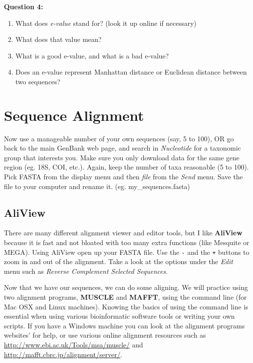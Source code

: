 \documentclass[11pt]{article}
\begin{document}
\begin{framed}
\noindent
\textbf{Question 4:}
\begin{enumerate}
    \item What does \textit{e-value} stand for? (look it up online if necessary)
    \item What does that value mean?
    \item What is a good e-value, and what is a bad e-value?
    \item Does an e-value represent Manhattan distance or Euclidean distance between two sequences?
\end{enumerate}
\end{framed}


\section{Sequence Alignment}


Now use a manageable number of your own sequences (say, 5 to 100),
OR
go back to the main GenBank web page, 
and search in \textit{Nucleotide} for a taxonomic group that interests you.
Make sure you only download data for the same gene region (eg. 18S, COI, etc.). 
Again, keep the number of taxa reasonable (5 to 100). 
Pick FASTA from the display menu and then \textit{file} from the \textit{Send} menu. 
Save the file to your computer and rename it. (eg. my\_sequences.fasta)

\subsection{AliView}

There are many different alignment viewer and editor tools,
but I like \textbf{AliView} because it is fast and not bloated
with too many extra functions (like Mesquite or MEGA).
Using AliView open up your FASTA file.
Use the \texttt{-} and the \texttt{+} buttons
to zoom in and out of the alignment.
Take a look at the options under the \textit{Edit} menu
such as \textit{Reverse Complement Selected Sequences}.

Now that we have our sequences, we can do some aligning.
We will practice using two alignment programs, 
\textbf{MUSCLE} and \textbf{MAFFT}, using the command line
(for Mac OSX and Linux machines). 
Knowing the basics of using the command line is essential
when using various bioinformatic software tools or writing
your own scripts.
If you have a Windows machine
you can look at the alignment programs websites' for help,
or use various online alignment resources such as
\url{http://www.ebi.ac.uk/Tools/msa/muscle/}
and \url{http://mafft.cbrc.jp/alignment/server/}.
\end{document}
